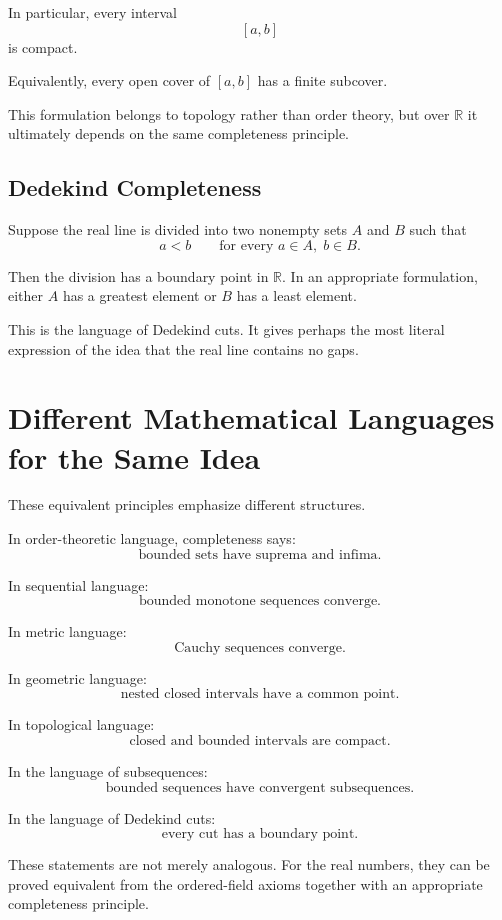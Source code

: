 \documentclass{essay}
\begin{document}
In particular, every interval
\[ [a,b] \]
is compact.

Equivalently, every open cover of \([a,b]\) has a finite subcover.

This formulation belongs to topology rather than order theory, but over \(\mathbb{R}\) it ultimately depends on the same completeness principle.

\subsection{Dedekind Completeness}

Suppose the real line is divided into two nonempty sets \(A\) and \(B\) such that
\[ a<b \qquad \text{for every } a\in A,\; b\in B. \]

Then the division has a boundary point in \(\mathbb{R}\). In an appropriate formulation, either \(A\) has a greatest element or \(B\) has a least element.

This is the language of Dedekind cuts. It gives perhaps the most literal expression of the idea that the real line contains no gaps.

\section{Different Mathematical Languages for the Same Idea}

These equivalent principles emphasize different structures.

In order-theoretic language, completeness says:
\[ \text{bounded sets have suprema and infima}. \]

In sequential language:
\[ \text{bounded monotone sequences converge}. \]

In metric language:
\[ \text{Cauchy sequences converge}. \]

In geometric language:
\[ \text{nested closed intervals have a common point}. \]

In topological language:
\[ \text{closed and bounded intervals are compact}. \]

In the language of subsequences:
\[ \text{bounded sequences have convergent subsequences}. \]

In the language of Dedekind cuts:
\[ \text{every cut has a boundary point}. \]

These statements are not merely analogous. For the real numbers, they can be proved equivalent from the ordered-field axioms together with an appropriate completeness principle.
\end{document}
